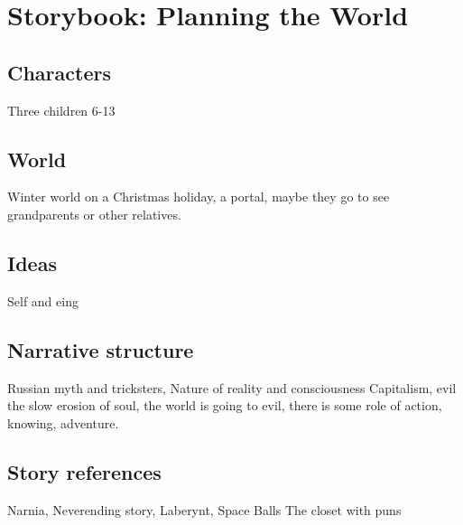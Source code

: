 \documentclass[12pt,openany]{book}      %
\title{\booktitle}
\author{\authorname}
\begin{document}
\frontmatter
% 
% 

\mainmatter
\pagestyle{fancy}
% 



\chapter{Storybook: Planning the World}

\section{Characters}
Three children 6-13

\section{World}
Winter world on a Christmas holiday, a portal, maybe they go to see grandparents or other relatives.

\section{Ideas}
Self and eing

\section{Narrative structure}
Russian myth and tricksters,
Nature of reality and consciousness
Capitalism, evil the slow erosion of soul, the world is going to evil, there is some role of action, knowing, adventure. 

\section{Story references}
Narnia, 
Neverending story, Laberynt, Space Balls
The closet with puns
\end{document}
